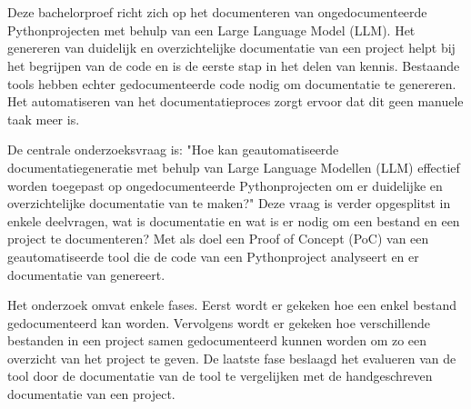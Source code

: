 
%
%
%
%
%


\chapter*{}

Deze bachelorproef richt zich op het documenteren van ongedocumenteerde Pythonprojecten met behulp van een Large Language Model (LLM).
Het genereren van duidelijk en overzichtelijke documentatie van een project helpt bij het begrijpen van de code en is de eerste stap in het delen van kennis.
Bestaande tools hebben echter gedocumenteerde code nodig om documentatie te genereren. 
Het automatiseren van het documentatieproces zorgt ervoor dat dit geen manuele taak meer is.  

De centrale onderzoeksvraag is: "Hoe kan geautomatiseerde documentatiegeneratie met behulp van Large Language Modellen (LLM) effectief worden toegepast op ongedocumenteerde Pythonprojecten om er duidelijke en overzichtelijke documentatie van te maken?" 
Deze vraag is verder opgesplitst in enkele deelvragen, wat is documentatie en wat is er nodig om een bestand en een project te documenteren?
Met als doel een Proof of Concept (PoC) van een geautomatiseerde tool die de code van een Pythonproject analyseert en er documentatie van genereert.

Het onderzoek omvat enkele fases. Eerst wordt er gekeken hoe een enkel bestand gedocumenteerd kan worden. 
Vervolgens wordt er gekeken hoe verschillende bestanden in een project samen gedocumenteerd kunnen worden om zo een overzicht van het project te geven.
De laatste fase beslaagd het evalueren van de tool door de documentatie van de tool te vergelijken met de handgeschreven documentatie van een project.

